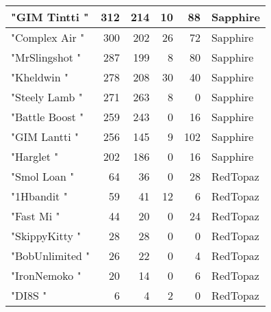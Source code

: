 \documentclass{article}
\begin{document}
\begin{table}[htbp]
\begin{tabular}{|l|r|r|r|r|l|}
"GIM Tintti " & 312 & 214 & 10 & 88 & Sapphire \\ \hline
"Complex Air " & 300 & 202 & 26 & 72 & Sapphire \\ \hline
"MrSlingshot " & 287 & 199 & 8 & 80 & Sapphire \\ \hline
"Kheldwin " & 278 & 208 & 30 & 40 & Sapphire \\ \hline
"Steely Lamb " & 271 & 263 & 8 & 0 & Sapphire \\ \hline
"Battle Boost " & 259 & 243 & 0 & 16 & Sapphire \\ \hline
"GIM Lantti " & 256 & 145 & 9 & 102 & Sapphire \\ \hline
"Harglet " & 202 & 186 & 0 & 16 & Sapphire \\ \hline
"Smol Loan " & 64 & 36 & 0 & 28 & RedTopaz \\ \hline
"1Hbandit " & 59 & 41 & 12 & 6 & RedTopaz \\ \hline
"Fast Mi " & 44 & 20 & 0 & 24 & RedTopaz \\ \hline
"SkippyKitty " & 28 & 28 & 0 & 0 & RedTopaz \\ \hline
"BobUnlimited " & 26 & 22 & 0 & 4 & RedTopaz \\ \hline
"IronNemoko " & 20 & 14 & 0 & 6 & RedTopaz \\ \hline
"DI8S " & 6 & 4 & 2 & 0 & RedTopaz \\ \hline
\end{tabular}
\end{table}
\end{document}
